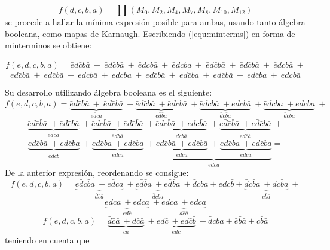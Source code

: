 \documentclass[a4paper]{article}
\begin{document}
\begin{equation}
f \left( d,c,b,a \right) = \prod \left( M_0,M_2,M_4,M_7,M_8,M_{10},M_{12} \right)
\label{equ:maxterms}
\end{equation}
se procede a hallar la mínima expresión posible para ambas, usando tanto álgebra booleana, como mapas de Karnaugh.
Escribiendo (\ref{equ:minterms}) en forma de minterminos se obtiene:
\begin{center}
\[
	f \left( e,d,c,b,a \right) = \bar{e}\bar{d}\bar{c}\bar{b}\bar{a} \ + \ \bar{e}\bar{d}\bar{c}b\bar{a} \ + \ \bar{e}\bar{d}c\bar{b}\bar{a} \ + \ \bar{e}\bar{d}cba \ + \ \bar{e}d\bar{c}\bar{b}\bar{a} \ + \ \bar{e}d\bar{c}b\bar{a} \ + \ \bar{e}dc\bar{b}\bar{a} \ +
\]
\[
	e\bar{d}\bar{c}\bar{b}\bar{a} \ + \ e\bar{d}\bar{c}b\bar{a} \ + \ e\bar{d}c\bar{b}\bar{a} \ + \ e\bar{d}cba \ + \ ed\bar{c}\bar{b}\bar{a}\ + \ ed\bar{c}\bar{b}a \ + \ ed\bar{c}b\bar{a} \ + \ ed\bar{c}ba \ + \ edc\bar{b}\bar{a} 
\]

Su desarrollo utilizando álgebra booleana es el siguiente:
\[
	f \left( e,d,c,b,a \right) = \underbrace{\bar{e}\bar{d}\bar{c}\bar{b}\bar{a} \ + \ \bar{e}\bar{d}\bar{c}b\bar{a} }_{\bar{e}\bar{d}\bar{c}\bar{a}}\ + 							\underbrace{\bar{e}\bar{d}\bar{c}\bar{b}\bar{a} \ + \bar{e}\bar{d}c\bar{b}  \bar{a}  }_{\bar{e}\bar{d}\bar{b}\bar{a}}\  +
				\underbrace{\bar{e}\bar{d} c \bar{b}\bar{a} \ + e \bar{d} c\bar{b}  \bar{a}  }_{\bar{d}c\bar{b}\bar{a}}\  +
				\underbrace{\bar{e}\bar{d} c b a \ + e \bar{d} c b a  }_{ \bar{d} c b a}\ +
\]
\[
				\underbrace{\bar{e} d  \bar{c} \bar{b} \bar{a} \ + \bar{e} d \bar{c} b \bar{a}  }_{ \bar{e} d \bar{c}  \bar{a}}\ +
				\underbrace{\bar{e} d  c \bar{b} \bar{a} \ + \bar{e} d \bar{c} \bar{b} \bar{a}  }_{ \bar{e} d \bar{b}  \bar{a}}\ +
				\underbrace{\bar{e} d  c \bar{b} \bar{a} \ + e d c \bar{b} \bar{a}  }_{  d c \bar{b}  \bar{a}}\ +
				\underbrace{e \bar{d} \bar{c} \bar{b} \bar{a} \ + e \bar{d} \bar{c} b \bar{a}  }_{  e\bar{d}  \bar{c}  \bar{a}}\ +
\]
\[
				\underbrace{e d \bar{c} \bar{b} \bar{a} \ + e d \bar{c} \bar{b} a }_{  e d  \bar{c}  \bar{b}}\ +
				\underbrace{e  d \bar{c} \bar{b} a \ + e d \bar{c} b a  }_{  ed  \bar{c}  a}\ +
				\underbrace{\underbrace{e d \bar{c} \bar{b} \bar{a} \ + e d \bar{c} b \bar{a}  }_{  ed  \bar{c}  \bar{a}}\ +
				\underbrace{e d \bar{c} \bar{b} a \ + e d \bar{c} b a  }_{ ed \bar{c}  \bar{a}}}_{  ed  \bar{c}  \bar{a}} =
\]
De la anterior expresión, reordenando se consigue:
\[
				f \left( e,d,c,b,a \right) =\underbrace{\bar{e} \bar{d} \bar{c} \bar{b} \bar{a} \ + e \bar{d} \bar{c} \bar{a}  }_{  \bar{d}  \bar{c}  \bar{a}}\ +
						\underbrace{\bar{e} \bar{d} \bar{b} \bar{a}  \ + \bar{e} \bar{d} \bar{b} \bar{a}  }_{  \bar{d}  c b a}\ +
						\bar{d} cba + ed\bar{c}\bar{b}+
						\underbrace{\bar{d} c \bar{b} \bar{a} \ + d c \bar{b} \bar{a}  }_{  c \bar{b} \bar{a}}\ +
\]
\[	
					\underbrace{e d  \bar{c} \bar{a} \ + e d \bar{c} a  }_{  ed \bar{c} }\ +
					\underbrace{\bar{e} d \bar{c} \bar{a} \ + e d \bar{c} \bar{a}  }_{  d \bar{c} \bar{a}}
\]
\[	
				f \left( e,d,c,b,a \right) =\underbrace{\bar{d}   \bar{c} \bar{a} \ + d  \bar{c} \bar{a}   }_{  \bar{c}\bar{a} }\ +
						\underbrace{e  d \bar{c} \ +e d  \bar{c} \bar{b}   }_{  e  d \bar{c}  }\ +\bar{d}cba+\bar{e}\bar{b}\bar{a}+c\bar{b}\bar{a}
\]
teniendo en cuenta que 


\end{center}
\end{document}
